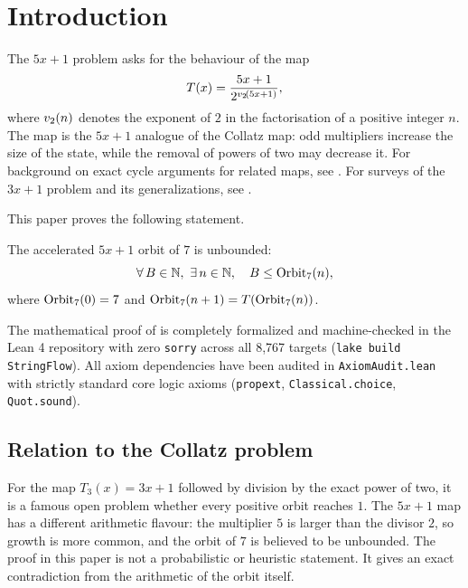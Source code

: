 \section{Introduction}\label{sec:intro}

The $5x+1$ problem asks for the behaviour of the map
\begin{equation}\label{eq:step}
  T(x)=\frac{5x+1}{2^{v_2\!\left(5x+1\right)}},
\end{equation}
where $v_2\!\left(n\right)$ denotes the exponent of $2$ in the factorisation of a
positive integer $n$.  The map is the $5x+1$ analogue of the
Collatz map: odd multipliers increase the size of the state, while the
removal of powers of two may decrease it.  For background on exact
cycle arguments for related maps, see \cite{simons2008}.  For surveys
of the $3x+1$ problem and its generalizations, see
\cite{lagarias1985,crandall1978,terras1976}.

This paper proves the following statement.

\begin{theorem}\label{thm:main}
The accelerated $5x+1$ orbit of $7$ is unbounded:
\begin{equation*}
  \forall\, B\in\mathbb{N},\ \exists\, n\in\mathbb{N},\quad
  B\le \mathrm{Orbit}_7(n),
\end{equation*}
where $\mathrm{Orbit}_7(0)=7$ and $\mathrm{Orbit}_7(n+1)=T(\mathrm{Orbit}_7(n))$.
\end{theorem}

\begin{remark}
The mathematical proof of  is completely formalized and machine-checked
in the Lean 4 repository with zero \texttt{sorry} across all 8,767 targets (\texttt{lake build StringFlow}).
All axiom dependencies have been audited in \texttt{AxiomAudit.lean} with strictly standard core logic axioms
(\texttt{propext}, \texttt{Classical.choice}, \texttt{Quot.sound}).
\end{remark}

\subsection{Relation to the Collatz problem}

For the map $T_3(x)=3x+1$ followed by division by the exact power of
two, it is a famous open problem whether every positive orbit reaches
$1$.  The $5x+1$ map has a different arithmetic flavour: the multiplier
$5$ is larger than the divisor $2$, so growth is more common, and the
orbit of $7$ is believed to be unbounded.  The proof in this paper is
not a probabilistic or heuristic statement.  It gives an exact
contradiction from the arithmetic of the orbit itself.

